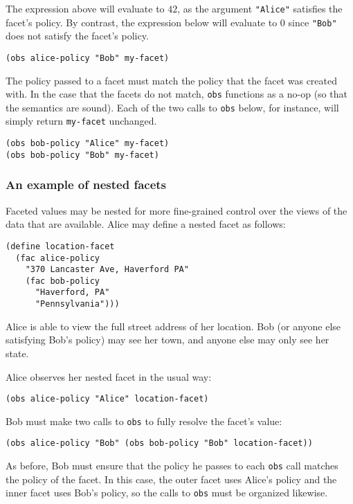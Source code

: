 \documentclass{article}
\begin{document}
The expression above will evaluate to $42$, as the argument \texttt{"Alice"} satisfies the facet's policy. By contrast, the expression below will evaluate to $0$ since \texttt{"Bob"} does not satisfy the facet's policy.

\begin{lstlisting}
(obs alice-policy "Bob" my-facet)
\end{lstlisting}

The policy passed to a facet must match the policy that the facet was created with. In the case that the facets do not match, \texttt{obs} functions as a no-op (so that the semantics are sound). Each of the two calls to \texttt{obs} below, for instance, will simply return \texttt{my-facet} unchanged.

\begin{lstlisting}
(obs bob-policy "Alice" my-facet)
(obs bob-policy "Bob" my-facet)
\end{lstlisting}

\subsubsection{An example of nested facets}
Faceted values may be nested for more fine-grained control over the views of the data that are available. Alice may define a nested facet as follows:

\begin{lstlisting}
(define location-facet
  (fac alice-policy
    "370 Lancaster Ave, Haverford PA"
    (fac bob-policy
      "Haverford, PA"
      "Pennsylvania")))
\end{lstlisting}

Alice is able to view the full street address of her location. Bob (or anyone else satisfying Bob's policy) may see her town, and anyone else may only see her state.

Alice observes her nested facet in the usual way:

\begin{lstlisting}
(obs alice-policy "Alice" location-facet)
\end{lstlisting}

Bob must make two calls to \texttt{obs} to fully resolve the facet's value:

\begin{lstlisting}
(obs alice-policy "Bob" (obs bob-policy "Bob" location-facet))
\end{lstlisting}

As before, Bob must ensure that the policy he passes to each \texttt{obs} call matches the policy of the facet. In this case, the outer facet uses Alice's policy and the inner facet uses Bob's policy, so the calls to \texttt{obs} must be organized likewise.
\end{document}
